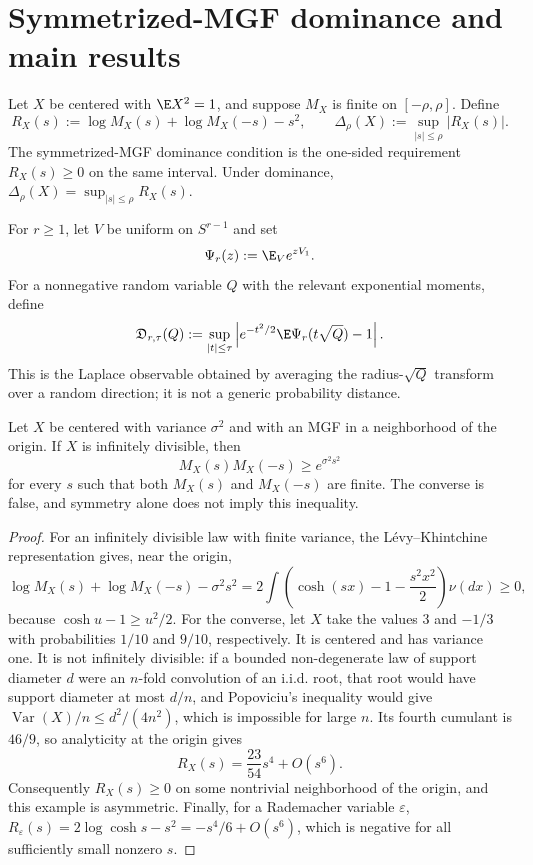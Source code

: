 \section{Symmetrized-MGF dominance and main results}\label{sec:main-results}

\begin{definition}\label{def:reflected-defect}
Let $X$ be centered with $\E X^2=1$, and suppose $M_X$ is finite on $[-\rho,\rho]$. Define
\[
R_X(s):=\log M_X(s)+\log M_X(-s)-s^2,
\qquad
\Delta_\rho(X):=\sup_{|s|\le\rho}|R_X(s)|.
\]
The symmetrized-MGF dominance condition is the one-sided requirement $R_X(s)\ge0$ on the same interval. Under dominance, $\Delta_\rho(X)=\sup_{|s|\le\rho}R_X(s)$.
\end{definition}

\begin{definition}\label{def:spherical-discrepancy}
For $r\ge1$, let $V$ be uniform on $S^{r-1}$ and set
\[
\Psi_r(z):=\E_V e^{zV_1}.
\]
For a nonnegative random variable $Q$ with the relevant exponential moments, define
\[
\mathfrak D_{r,\tau}(Q)
 :=\sup_{|t|\le\tau}
 \left|e^{-t^2/2}\E\Psi_r(t\sqrt Q)-1\right|.
\]
This is the Laplace observable obtained by averaging the radius-$\sqrt Q$ transform over a random direction; it is not a generic probability distance.
\end{definition}

\begin{proposition}\label{prop:naturality}
Let $X$ be centered with variance $\sigma^2$ and with an MGF in a neighborhood of the origin. If $X$ is infinitely divisible, then
\[
M_X(s)M_X(-s)\ge e^{\sigma^2s^2}
\]
for every $s$ such that both $M_X(s)$ and $M_X(-s)$ are finite. The converse is false, and symmetry alone does not imply this inequality.
\end{proposition}

\begin{proof}
For an infinitely divisible law with finite variance, the L\'evy--Khintchine representation gives, near the origin,
\[
\log M_X(s)+\log M_X(-s)-\sigma^2s^2
 =2\int\left(\cosh(sx)-1-\frac{s^2x^2}{2}\right)\nu(dx)\ge0,
\]
because $\cosh u-1\ge u^2/2$. For the converse, let $X$ take the values $3$ and $-1/3$ with probabilities $1/10$ and $9/10$, respectively. It is centered and has variance one. It is not infinitely divisible: if a bounded non-degenerate law of support diameter $d$ were an $n$-fold convolution of an i.i.d. root, that root would have support diameter at most $d/n$, and Popoviciu's inequality would give $\operatorname{Var}(X)/n\le d^2/(4n^2)$, which is impossible for large $n$. Its fourth cumulant is $46/9$, so analyticity at the origin gives
\[
R_X(s)=\frac{23}{54}s^4+O(s^6).
\]
Consequently $R_X(s)\ge0$ on some nontrivial neighborhood of the origin, and this example is asymmetric. Finally, for a Rademacher variable $\varepsilon$, $R_\varepsilon(s)=2\log\cosh s-s^2=-s^4/6+O(s^6)$, which is negative for all sufficiently small nonzero $s$.
\end{proof}

